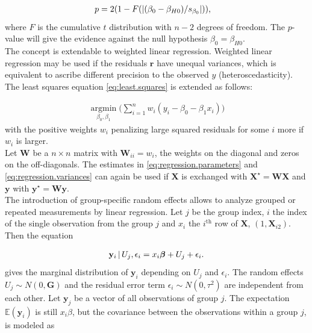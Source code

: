 \documentclass[11pt,a4paper,twoside]{book}\usepackage[]{graphicx}\usepackage[]{color}
\begin{document}
\begin{align}
p &= 2(1-F(\left\lvert(\beta_0 - \beta_{H0})/s_{\beta_0}\right\rvert)), \nonumber
\end{align}
where $F$ is the cumulative $t$ distribution with $n-2$ degrees of freedom. The  $p$\hspace{0.4mm}-value will give the evidence against the null hypothesis $\beta_0 = \beta_{H0}$. \\
The concept is extendable to weighted linear regression. Weighted linear regression may be used if the residuals $\mathbf{r}$ have unequal variances, which is equivalent to ascribe different precision to the observed $y$ (heteroscedasticity). The least squares equation \eqref{eq:least.squares} is extended as follows:

\begin{align}
\operatorname*{argmin}_{\beta_0, \beta_1}\Big(\sum_{i = 1}^n w_i(y_i - \beta_0 - \beta_1 x_i)\Big) \nonumber
\end{align}
with the positive weights $w_i$ penalizing large squared residuals for some $i$ more if $w_i$ is larger. \\
Let $\mathbf{W}$ be a $n \times n$ matrix with $\mathbf{W}_{ii} = w_i$, the weights on the diagonal and zeros on the off-diagonals. The estimates in \eqref{eq:regression.parameters} and \eqref{eq:regression.variances} can again be used if $\mathbf{X}$ is exchanged with $\mathbf{X}^\star =  \mathbf{W} \mathbf{X}$ and $\mathbf{y}$ with $\mathbf{y}^\star = \mathbf{W} \mathbf{y}$. \label{weighted.regression} \\
The introduction of group-specific random effects allows to analyze grouped or repeated measurements by linear regression. Let $j$ be the group index, $i$ the index of the single observation from the group $j$ and $x_i$ the $i^\textrm{th}$ row of $\mathbf{X}$, $(1, \mathbf{X}_{i2})$. Then the equation

\begin{align}
\mathbf{y}_i \,\vert\, U_j,\epsilon_{i} =  x_i\boldsymbol{\beta}+ U_j + \epsilon_{i}. \label{eq:one.random.intercept}
\end{align}
gives the marginal distribution of $\mathbf{y}_i$ depending on $U{_j}$ and $\epsilon_i$. The random effects $U_j \sim N(0, \mathbf{G})$ and the residual error term $\epsilon_i \sim N(0, \tau^{2})$ are independent from each other. Let $\mathbf{y}_j$ be a vector of all observations of group $j$. The expectation $\mathbb{E}(\mathbf{y}_i)$ is still $x_i \beta$, but the covariance between the observations within a group $j$, is modeled as
\end{document}
